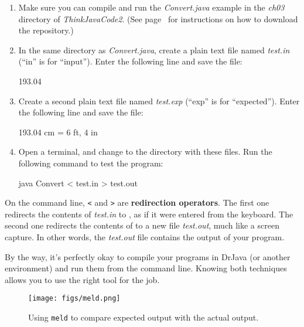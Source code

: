 \begin{enumerate}

\item Make sure you can compile and run the {\it Convert.java} example in the {\it ch03} directory of {\it ThinkJavaCode2}.
(See page~\pageref{code} for instructions on how to download the repository.)

\item In the same directory as {\it Convert.java}, create a plain text file named {\it test.in} (``in'' is for ``input'').
Enter the following line and save the file:

\begin{stdout}
193.04
\end{stdout}

\item Create a second plain text file named {\it test.exp} (``exp'' is for ``expected'').
Enter the following line and save the file:

\begin{stdout}
193.04 cm = 6 ft, 4 in
\end{stdout}

\item Open a terminal, and change to the directory with these files.
Run the following command to test the program:

\begin{stdout}
java Convert < test.in > test.out
\end{stdout}

\end{enumerate}


On the command line, {\tt <} and {\tt >} are {\bf redirection operators}.
The first one redirects the contents of {\it test.in} to , as if it were entered from the keyboard.
The second one redirects the contents of  to a new file {\it test.out}, much like a screen capture.
In other words, the {\it test.out} file contains the output of your program.

By the way, it's perfectly okay to compile your programs in DrJava (or another environment) and run them from the command line.
Knowing both techniques allows you to use the right tool for the job.


\begin{figure}[!ht]
\begin{center}
\texttt{[image: figs/meld.png]}
\caption{Using {\tt meld} to compare expected output with the actual output.}
\label{fig.meld}
\end{center}
\end{figure}


